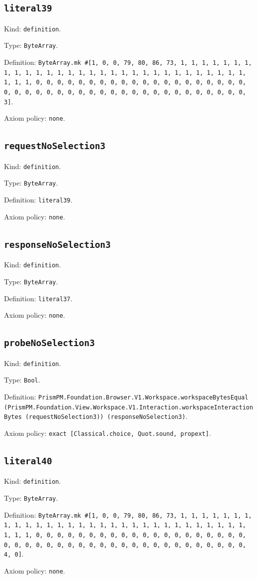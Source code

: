 \documentclass[11pt]{article}
\begin{document}
\subsection*{\texttt{literal39}}
\noindent Kind: \texttt{definition}.\par
\noindent Type: \texttt{ByteArray}.\par
\noindent Definition: \texttt{ByteArray.mk \#[1, 0, 0, 79, 80, 86, 73, 1, 1, 1, 1, 1, 1, 1, 1, 1, 1, 1, 1, 1, 1, 1, 1, 1, 1, 1, 1, 1, 1, 1, 1, 1, 1, 1, 1, 1, 1, 1, 1, 1, 0, 0, 0, 0, 0, 0, 0, 0, 0, 0, 0, 0, 0, 0, 0, 0, 0, 0, 0, 0, 0, 0, 0, 0, 0, 0, 0, 0, 0, 0, 0, 0, 0, 0, 0, 0, 0, 0, 0, 0, 0, 0, 0, 3]}.\par
\noindent Axiom policy: \texttt{none}.\par
\subsection*{\texttt{requestNoSelection3}}
\noindent Kind: \texttt{definition}.\par
\noindent Type: \texttt{ByteArray}.\par
\noindent Definition: \texttt{literal39}.\par
\noindent Axiom policy: \texttt{none}.\par
\subsection*{\texttt{responseNoSelection3}}
\noindent Kind: \texttt{definition}.\par
\noindent Type: \texttt{ByteArray}.\par
\noindent Definition: \texttt{literal37}.\par
\noindent Axiom policy: \texttt{none}.\par
\subsection*{\texttt{probeNoSelection3}}
\noindent Kind: \texttt{definition}.\par
\noindent Type: \texttt{Bool}.\par
\noindent Definition: \texttt{PrismPM.Foundation.Browser.V1.Workspace.workspaceBytesEqual (PrismPM.Foundation.View.Workspace.V1.Interaction.workspaceInteractionBytes (requestNoSelection3)) (responseNoSelection3)}.\par
\noindent Axiom policy: \texttt{exact [Classical.choice, Quot.sound, propext]}.\par
\subsection*{\texttt{literal40}}
\noindent Kind: \texttt{definition}.\par
\noindent Type: \texttt{ByteArray}.\par
\noindent Definition: \texttt{ByteArray.mk \#[1, 0, 0, 79, 80, 86, 73, 1, 1, 1, 1, 1, 1, 1, 1, 1, 1, 1, 1, 1, 1, 1, 1, 1, 1, 1, 1, 1, 1, 1, 1, 1, 1, 1, 1, 1, 1, 1, 1, 1, 0, 0, 0, 0, 0, 0, 0, 0, 0, 0, 0, 0, 0, 0, 0, 0, 0, 0, 0, 0, 0, 0, 0, 0, 0, 0, 0, 0, 0, 0, 0, 0, 0, 0, 0, 0, 0, 0, 0, 0, 0, 0, 0, 4, 0]}.\par
\noindent Axiom policy: \texttt{none}.\par
\end{document}
